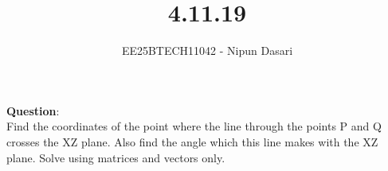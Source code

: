 \documentclass[journal]{IEEEtran}
\begin{document}
	
	
\vspace{3cm}

\title{4.11.19}
\author{EE25BTECH11042 - Nipun Dasari}
\maketitle

\renewcommand{\thefigure}{\theenumi}
\renewcommand{\thetable}{\theenumi}
\setlength{\intextsep}{10pt} %


\renewcommand{\thetable}{\theenumi}
	
	\textbf{Question}:\\
	Find the coordinates of the point where the line through the points P and Q crosses the XZ plane. Also find the angle which this line makes with the XZ plane. Solve using matrices and vectors only.
	
	\solution
	
\end{document}
